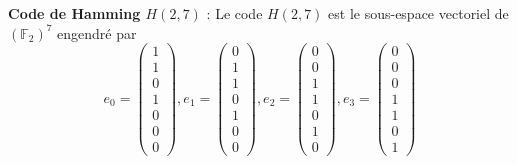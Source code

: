 \textbf{Code de Hamming $H(2,7)$} : Le code $H(2,7)$ est le sous-espace vectoriel de $(\mathbb F_2)^7$ engendré par
\[e_0=\begin{pmatrix}1 \\ 1\\ 0 \\ 1 \\ 0\\0 \\0 \end{pmatrix},
 e_1=\begin{pmatrix}0 \\1 \\ 1\\ 0 \\ 1 \\ 0\\0  \end{pmatrix},
e_2=\begin{pmatrix}0\\0\\ 1 \\ 1\\ 0 \\ 1 \\ 0 \end{pmatrix},
e_3=\begin{pmatrix}0\\0\\0\\ 1 \\ 1\\ 0 \\ 1 \end{pmatrix}\] 
 
